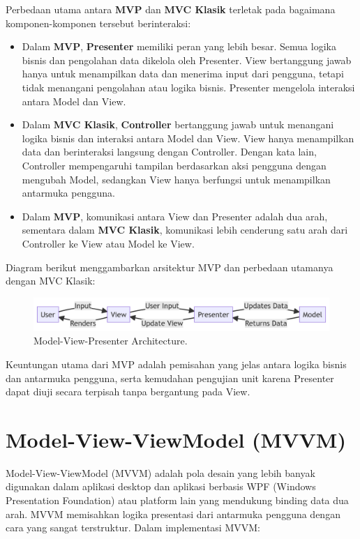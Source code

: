 Perbedaan utama antara \textbf{MVP} dan \textbf{MVC Klasik} terletak pada bagaimana komponen-komponen tersebut berinteraksi:
\begin{itemize}
	\item Dalam \textbf{MVP}, \textbf{Presenter} memiliki peran yang lebih besar. Semua logika bisnis dan pengolahan data dikelola oleh Presenter. View bertanggung jawab hanya untuk menampilkan data dan menerima input dari pengguna, tetapi tidak menangani pengolahan atau logika bisnis. Presenter mengelola interaksi antara Model dan View.
	\item Dalam \textbf{MVC Klasik}, \textbf{Controller} bertanggung jawab untuk menangani logika bisnis dan interaksi antara Model dan View. View hanya menampilkan data dan berinteraksi langsung dengan Controller. Dengan kata lain, Controller mempengaruhi tampilan berdasarkan aksi pengguna dengan mengubah Model, sedangkan View hanya berfungsi untuk menampilkan antarmuka pengguna.
	\item Dalam \textbf{MVP}, komunikasi antara View dan Presenter adalah dua arah, sementara dalam \textbf{MVC Klasik}, komunikasi lebih cenderung satu arah dari Controller ke View atau Model ke View.
\end{itemize}

Diagram berikut menggambarkan arsitektur MVP dan perbedaan utamanya dengan MVC Klasik:

\begin{figure}[h]
	\centering
	\includegraphics[width=\textwidth]{../images/mvp.png}
	\caption{Model-View-Presenter Architecture.}
	\label{fig:mvp-architecture}
\end{figure}

Keuntungan utama dari MVP adalah pemisahan yang jelas antara logika bisnis dan antarmuka pengguna, serta kemudahan pengujian unit karena Presenter dapat diuji secara terpisah tanpa bergantung pada View.

\section{Model-View-ViewModel (MVVM)}

Model-View-ViewModel (MVVM) adalah pola desain yang lebih banyak digunakan dalam aplikasi desktop dan aplikasi berbasis WPF (Windows Presentation Foundation) atau platform lain yang mendukung binding data dua arah. MVVM memisahkan logika presentasi dari antarmuka pengguna dengan cara yang sangat terstruktur. Dalam implementasi MVVM:

